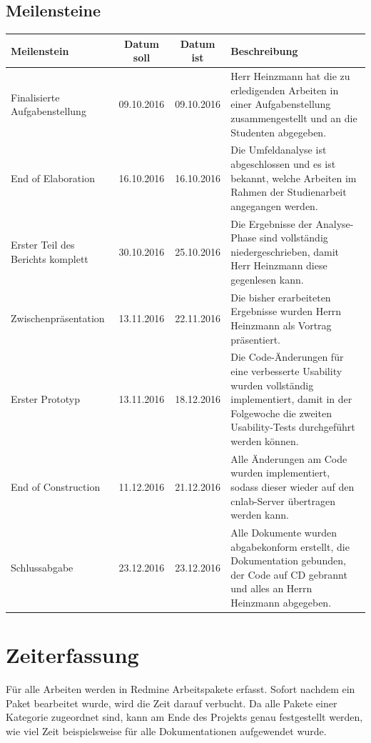 
 
 \subsection{Meilensteine}
 
 \begin{tabularx}{\linewidth}{|p{4.5cm}|c|c|X|}
 	\hline
 	\textbf{Meilenstein} & \textbf{Datum soll} & \textbf{Datum ist} &\textbf{Beschreibung} \\
 	\hline
 	Finalisierte Aufgabenstellung & 09.10.2016 & 09.10.2016 & Herr Heinzmann hat die zu erledigenden Arbeiten in einer Aufgabenstellung zusammengestellt und an die Studenten abgegeben. \\
 	\hline
 	End of Elaboration & 16.10.2016 & 16.10.2016 & Die Umfeldanalyse ist abgeschlossen und es ist bekannt, welche Arbeiten im Rahmen der Studienarbeit angegangen werden. \\
 	\hline
 	Erster Teil des Berichts komplett & 30.10.2016 & 25.10.2016 & Die Ergebnisse der Analyse-Phase sind vollständig niedergeschrieben, damit Herr Heinzmann diese gegenlesen kann. \\
 	\hline
 	Zwischenpräsentation & 13.11.2016 & 22.11.2016 & Die bisher erarbeiteten Ergebnisse wurden Herrn Heinzmann als Vortrag präsentiert. \\
 	\hline
 	Erster Prototyp & 13.11.2016 & 18.12.2016 & Die Code-Änderungen für eine verbesserte Usability wurden vollständig implementiert, damit in der Folgewoche die zweiten Usability-Tests durchgeführt werden können. \\
 	\hline
 	End of Construction & 11.12.2016 & 21.12.2016 & Alle Änderungen am Code wurden implementiert, sodass dieser wieder auf den cnlab-Server übertragen werden kann. \\
 	\hline
 	Schlussabgabe & 23.12.2016 & 23.12.2016 & Alle Dokumente wurden abgabekonform erstellt, die Dokumentation gebunden, der Code auf CD gebrannt und alles an Herrn Heinzmann abgegeben. \\
 	\hline
 \end{tabularx}
 
 
 
 \section{Zeiterfassung}
 Für alle Arbeiten werden in Redmine Arbeitspakete erfasst. Sofort nachdem ein Paket bearbeitet wurde, wird die Zeit darauf verbucht. Da alle Pakete einer Kategorie zugeordnet sind, kann am Ende des Projekts genau festgestellt werden, wie viel Zeit beispielsweise für alle Dokumentationen aufgewendet wurde.
 

